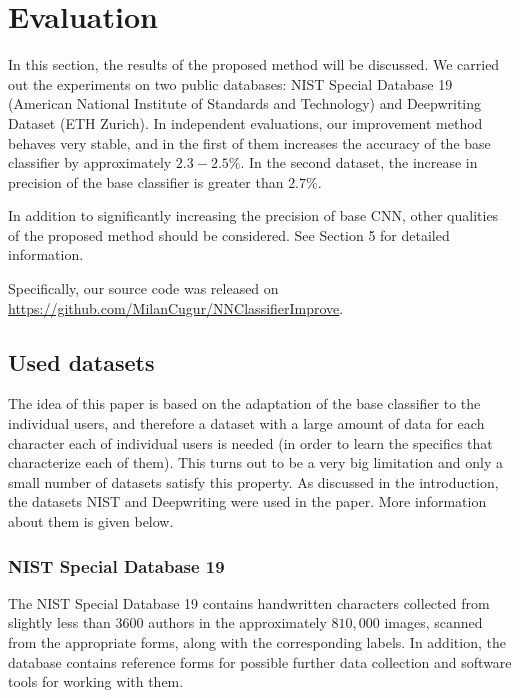 \documentclass{article}
\begin{document}
\section{Evaluation}

In this section, the results of the proposed method will be discussed.
We carried out the experiments on two public databases: NIST Special Database 19 (American National Institute of Standards and Technology) and
Deepwriting Dataset (ETH Zurich). %
In independent evaluations, our improvement method behaves very stable, and in the first of them increases the accuracy of the base classifier by approximately $2.3-2.5\%$.
In the second dataset, the increase in precision of the base classifier is greater than $2.7\%$.

In addition to significantly increasing the precision of base CNN, other qualities of the proposed method should be considered.
See Section 5 for detailed information. %

Specifically, our source code was released on \url{https://github.com/MilanCugur/NNClassifierImprove}.

\subsection{Used datasets}

The idea of this paper is based on the adaptation of the base classifier to the individual users,
and therefore a dataset with a large amount of data for each character each of individual users is needed
(in order to learn the specifics that characterize each of them).
This turns out to be a very big limitation and only a small number of datasets satisfy this property.
As discussed in the introduction, the datasets NIST and Deepwriting were used in the paper.
More information about them is given below.

\subsubsection{NIST Special Database 19}

The NIST Special Database 19 \citet{nist} contains handwritten characters collected from slightly less than $3600$ authors in the approximately $810,000$ images,
scanned from the appropriate forms, along with the corresponding labels.
In addition, the database contains reference forms for possible further data collection and software tools for working with them.
\end{document}
